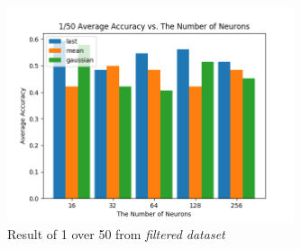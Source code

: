 \documentclass[draft,dvipsnames]{drexel-thesis}
\begin{document}
\begin{thesis}
\begin{figure}[t!]
    \centering
    \includegraphics[width=0.75\textwidth]{pictures/result_pictures/filtered_1_50_result.png}
    \caption{Result of 1 over 50 from {\em filtered dataset}}
    \label{fig:filter_1_50}
\end{figure}


\end{thesis}
\end{document}
